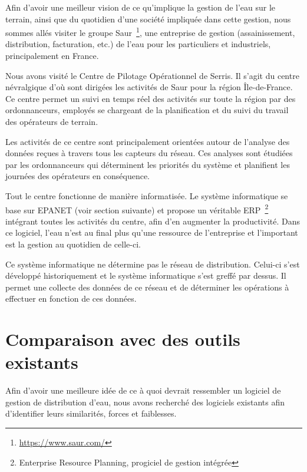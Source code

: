 \documentclass{EPL-master-thesis-covers-FR}
\begin{document}
				Afin d'avoir une meilleur vision de ce qu'implique la gestion de l'eau sur le terrain, ainsi que du quotidien d'une société impliquée dans cette gestion, nous sommes allés visiter le groupe Saur~\footnote{\url{https://www.saur.com/}}, une entreprise de gestion (assainissement, distribution, facturation, etc.) de l'eau pour les particuliers et industriels, principalement en France.

				Nous avons visité le Centre de Pilotage Opérationnel de Serris. Il s'agit du centre névralgique d'où sont dirigées les activités de Saur pour la région Île-de-France. Ce centre permet un suivi en temps réel des activités sur toute la région par des ordonnanceurs, employés se chargeant de la planification et du suivi du travail des opérateurs de terrain.

				Les activités de ce centre sont principalement orientées autour de l'analyse des données reçues à travers tous les capteurs du réseau. Ces analyses sont étudiées par les ordonnanceurs qui déterminent les priorités du système et planifient les journées des opérateurs en conséquence.

				Tout le centre fonctionne de manière informatisée. Le système informatique se base sur EPANET (voir section suivante) et propose un véritable ERP~\footnote{Enterprise Resource Planning, progiciel de gestion intégrée} intégrant toutes les activités du centre, afin d'en augmenter la productivité. Dans ce logiciel, l'eau n'est au final plus qu'une ressource de l'entreprise et l'important est la gestion au quotidien de celle-ci.

				Ce système informatique ne détermine pas le réseau de distribution. Celui-ci s'est développé historiquement et le système informatique s'est greffé par dessus. Il permet une collecte des données de ce réseau et de déterminer les opérations à effectuer en fonction de ces données.

		\section{Comparaison avec des outils existants}
			\label{sec:outils_existants}

			Afin d'avoir une meilleure idée de ce à quoi devrait ressembler un logiciel de gestion de distribution d'eau, nous avons recherché des logiciels existants afin d'identifier leurs similarités, forces et faiblesses.
\end{document}
